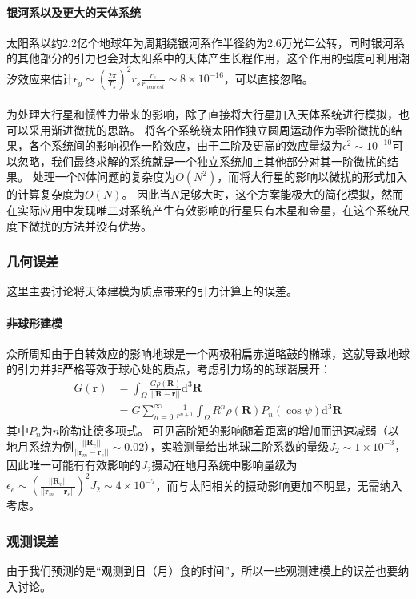 \documentclass[hidelinks]{article}
\begin{document}
\paragraph{银河系以及更大的天体系统}
太阳系以约2.2亿个地球年为周期绕银河系作半径约为2.6万光年公转，同时银河系的其他部分的引力也会对太阳系中的天体产生长程作用，这个作用的强度可利用潮汐效应来估计$\epsilon_g\sim(\frac{2\pi}{T_s})^2r_s\frac{r_e}{r_{nearest}}\sim8\times10^{-16}$，可以直接忽略。
\\
\\
为处理大行星和惯性力带来的影响，除了直接将大行星加入天体系统进行模拟，也可以采用渐进微扰的思路。
将各个系统绕太阳作独立圆周运动作为零阶微扰的结果，各个系统间的影响视作一阶效应，由于二阶及更高的效应量级为$\epsilon^2\sim10^{-10}$可以忽略，我们最终求解的系统就是一个独立系统加上其他部分对其一阶微扰的结果。
处理一个N体问题的复杂度为$O(N^2)$，而将大行星的影响以微扰的形式加入的计算复杂度为$O(N)$。
因此当$N$足够大时，这个方案能极大的简化模拟，然而在实际应用中发现唯二对系统产生有效影响的行星只有木星和金星，在这个系统尺度下微扰的方法并没有优势。
\subsubsection{几何误差}
这里主要讨论将天体建模为质点带来的引力计算上的误差。
\paragraph{非球形建模}众所周知由于自转效应的影响地球是一个两极稍扁赤道略鼓的椭球，这就导致地球的引力并非严格等效于球心处的质点，考虑引力场的的球谐展开：
\begin{align*}
    G(\mathbf{r})&=\int_{\Omega}\frac{G\rho(\mathbf{R})}{||\mathbf{R}-\mathbf{r}||}\mathrm{d}^3\mathbf{R}\\
    &=G\sum_{n=0}^\infty\frac{1}{r^{n+1}}\int_\Omega R^n\rho(\mathbf{R})P_n(\cos{\psi})\mathrm{d}^3\mathbf{R}
\end{align*}
其中$P_n$为$n$阶勒让德多项式。
可见高阶矩的影响随着距离的增加而迅速减弱（以地月系统为例$\frac{||\mathbf{R}_e||}{||\mathbf{r}_m-\mathbf{r}_e||}\sim0.02$），实验测量给出地球二阶系数的量级$J_2\sim1\times10^{-3}$，因此唯一可能有有效影响的$J_2$摄动在地月系统中影响量级为$\epsilon_e\sim(\frac{||\mathbf{R}_e||}{||\mathbf{r}_m-\mathbf{r}_e||})^2J_2\sim4\times10^{-7}$，而与太阳相关的摄动影响更加不明显，无需纳入考虑。

\subsubsection{观测误差}
由于我们预测的是“观测到日（月）食的时间”，所以一些观测建模上的误差也要纳入讨论。
\end{document}
